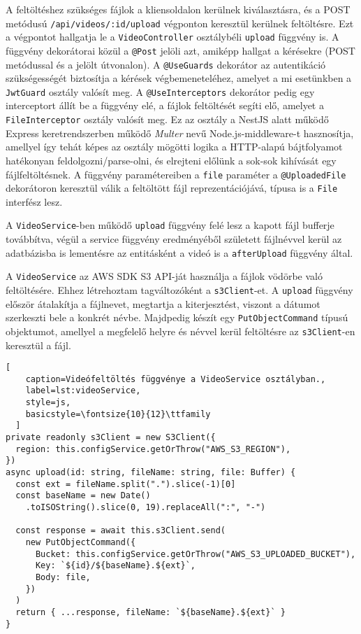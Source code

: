 A feltöltéshez szükséges fájlok a kliensoldalon kerülnek kiválasztásra, és a POST metódusú \verb|/api/videos/:id/upload| végponton keresztül kerülnek feltöltésre. Ezt a végpontot hallgatja le a \verb|VideoController| osztálybéli \verb|upload| függvény is. A függvény dekorátorai közül a \verb|@Post| jelöli azt, amiképp hallgat a kérésekre (POST metódussal és a jelölt útvonalon). A \verb|@UseGuards| dekorátor az autentikáció szükségességét biztosítja a kérések végbemeneteléhez, amelyet a mi esetünkben a \verb|JwtGuard| osztály valósít meg. A \verb|@UseInterceptors| dekorátor pedig egy interceptort állít be a függvény elé, a fájlok feltöltését segíti elő, amelyet a \verb|FileInterceptor| osztály valósít meg. Ez az osztály a NestJS alatt működő Express keretrendszerben működő \emph{Multer} nevű Node.js-middleware-t hasznosítja, amellyel így tehát képes az osztály mögötti logika a HTTP-alapú bájtfolyamot hatékonyan feldolgozni/parse-olni, és elrejteni előlünk a sok-sok kihívását egy fájlfeltöltésnek. A függvény paramétereiben a \verb|file| paraméter a \verb|@UploadedFile| dekorátoron keresztül válik a feltöltött fájl reprezentációjává, típusa is a \verb|File| interfész lesz.

A \verb|VideoService|-ben működő \verb|upload| függvény felé lesz a kapott fájl bufferje továbbítva, végül a service függvény eredményéből született fájlnévvel kerül az adatbázisba is lementésre az entitásként a videó is a \verb|afterUpload| függvény által.

A \verb|VideoService| az AWS SDK S3 API-ját használja a fájlok vödörbe való feltöltésére. Ehhez létrehoztam tagváltozóként a \verb|s3Client|-et. A \verb|upload| függvény először átalakítja a fájlnevet, megtartja a kiterjesztést, viszont a dátumot szerkeszti bele a konkrét névbe. Majdpedig készít egy \verb|PutObjectCommand| típusú objektumot, amellyel a megfelelő helyre és névvel kerül feltöltésre az \verb|s3Client|-en keresztül a fájl.

\begin{minipage}{0.92\textwidth}
  \begin{lstlisting}[
    caption=Videófeltöltés függvénye a VideoService osztályban.,
    label=lst:videoService,
    style=js,
    basicstyle=\fontsize{10}{12}\ttfamily
  ]
private readonly s3Client = new S3Client({
  region: this.configService.getOrThrow("AWS_S3_REGION"),
})
async upload(id: string, fileName: string, file: Buffer) {
  const ext = fileName.split(".").slice(-1)[0]
  const baseName = new Date()
    .toISOString().slice(0, 19).replaceAll(":", "-")

  const response = await this.s3Client.send(
    new PutObjectCommand({
      Bucket: this.configService.getOrThrow("AWS_S3_UPLOADED_BUCKET"),
      Key: `${id}/${baseName}.${ext}`,
      Body: file,
    })
  )
  return { ...response, fileName: `${baseName}.${ext}` }
}
\end{lstlisting}
\end{minipage}
